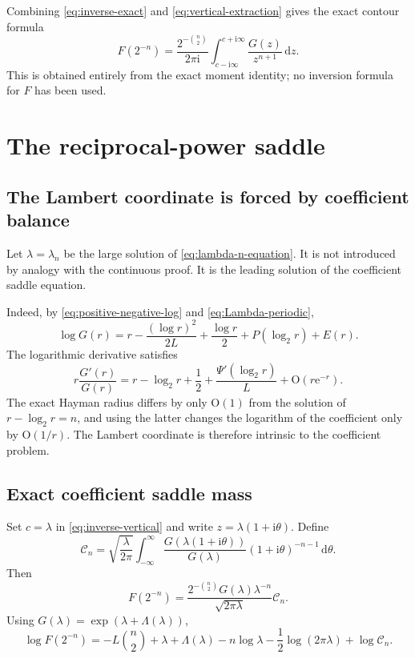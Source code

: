 \documentclass[11pt,oneside]{article}
\theoremstyle{definition}
\theoremstyle{remark}
\newcommand{\e}{\mathrm e}
\newcommand{\ii}{\mathrm i}
\newcommand{\dd}{\,\mathrm d}
\newcommand{\bigO}{\mathrm O}
\newcommand{\CoeffMass}{\mathcal C}
\begin{document}
Combining \eqref{eq:inverse-exact} and \eqref{eq:vertical-extraction} gives the exact contour formula
\begin{equation}
 F(2^{-n})=
 \frac{2^{-\binom n2}}{2\pi\ii}
 \int_{c-\ii\infty}^{c+\ii\infty}
 \frac{G(z)}{z^{n+1}}\dd z.
\label{eq:inverse-vertical}
\end{equation}
This is obtained entirely from the exact moment identity; no inversion formula for $F$ has been used.

\section{The reciprocal-power saddle}
\label{sec:inverse-saddle}

\subsection{The Lambert coordinate is forced by coefficient balance}

Let $\lambda=\lambda_n$ be the large solution of \eqref{eq:lambda-n-equation}.  It is not introduced by analogy with the continuous proof.  It is the leading solution of the coefficient saddle equation.

Indeed, by \eqref{eq:positive-negative-log} and \eqref{eq:Lambda-periodic},
\begin{equation}
 \log G(r)=
 r-\frac{(\log r)^2}{2L}+\frac{\log r}{2}
 +P(\log_2r)+E(r).
\label{eq:logG-positive}
\end{equation}
The logarithmic derivative satisfies
\begin{equation}
 r\frac{G'(r)}{G(r)}
 =r-\log_2r+\frac12+\frac{\Psi'(\log_2r)}L+\bigO(r\e^{-r}).
\label{eq:coefficient-saddle-exactish}
\end{equation}
The exact Hayman radius differs by only $\bigO(1)$ from the solution of
$r-\log_2r=n$, and using the latter changes the logarithm of the coefficient only by
$\bigO(1/r)$.  The Lambert coordinate is therefore intrinsic to the coefficient problem.

\subsection{Exact coefficient saddle mass}

Set $c=\lambda$ in \eqref{eq:inverse-vertical} and write
$z=\lambda(1+\ii\theta)$.  Define
\begin{equation}
 \CoeffMass_n=
 \sqrt{\frac{\lambda}{2\pi}}
 \int_{-\infty}^{\infty}
 \frac{G(\lambda(1+\ii\theta))}{G(\lambda)}
 (1+\ii\theta)^{-n-1}\dd\theta.
\label{eq:Cn-def}
\end{equation}
Then
\begin{equation}
 F(2^{-n})=
 \frac{2^{-\binom n2}G(\lambda)\lambda^{-n}}
 {\sqrt{2\pi\lambda}}\CoeffMass_n.
\label{eq:exact-coefficient-saddle}
\end{equation}
Using $G(\lambda)=\exp(\lambda+\Lambda(\lambda))$,
\begin{equation}
 \log F(2^{-n})=
 -L\binom n2+\lambda+\Lambda(\lambda)-n\log\lambda
 -\frac12\log(2\pi\lambda)+\log\CoeffMass_n.
\label{eq:exact-log-coefficient}
\end{equation}
\end{document}
